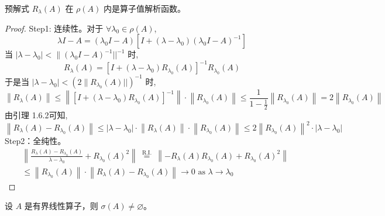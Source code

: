 \documentclass[lang=cn,newtx,10pt,scheme=chinese,thmcnt=chapter]{elegantbook}
\begin{document}
\begin{theorem}预解式 $R_\lambda(A)$ 在 $\rho(A)$ 内是算子值解析函数。
\end{theorem}
\begin{proof}
Step1: 连续性。对于 $\forall \lambda_0 \in \rho(A)$,
\begin{equation*}
\lambda I-A=\left(\lambda_0 I-A\right)\left[I+\left(\lambda-\lambda_0\right)\left(\lambda_0 I-A\right)^{-1}\right]
\end{equation*}
当 $\left|\lambda-\lambda_0\right|<\|\left(\lambda_0 I-A\right)^{-1}| |^{-1}$ 时,
\begin{equation*}
R_\lambda(A)=\left[I+\left(\lambda-\lambda_0\right) R_{\lambda_0}(A)\right]^{-1} R_{\lambda_0}(A)
\end{equation*}
于是当 $\left|\lambda-\lambda_0\right|<\left(2 \| R_{\lambda_0}(A)| |\right)^{-1}$ 时,
\begin{equation*}
\left\|R_\lambda(A)\right\| \leqslant\left\|\left[I+\left(\lambda-\lambda_0\right) R_{\lambda_0}(A)\right]^{-1}\right\| \cdot\left\|R_{\lambda_0}(A)\right\| \leqslant \frac{1}{1-\frac{1}{2}}\left\|R_{\lambda_0}(A)\right\|=2\left\|R_{\lambda_0}(A)\right\|
\end{equation*}
由引理 1.6.2可知,
\begin{equation*}
\left\|R_\lambda(A)-R_{\lambda_0}(A)\right\| \leqslant\left|\lambda-\lambda_0\right| \cdot\left\|R_\lambda(A)\right\| \cdot\left\|R_{\lambda_0}(A)\right\| \leqslant 2\left\|R_{\lambda_0}(A)\right\|^2 \cdot\left|\lambda-\lambda_0\right|
\end{equation*}
Step2：全纯性。
\begin{equation*}
\begin{aligned}
&\left\|\frac{R_\lambda(A)-R_{\lambda_0}(A)}{\lambda-\lambda_0}+R_{\lambda_0}(A)^2\right\| \stackrel{\text { R.I. }}{=}\left\|-R_\lambda(A) R_{\lambda_0}(A)+R_{\lambda_0}(A)^2\right\| \\
& \leqslant\left\|R_{\lambda_0}(A)\right\| \cdot\left\|R_\lambda(A)-R_{\lambda_0}(A)\right\| \rightarrow 0 \text { as } \lambda \rightarrow \lambda_0
\end{aligned}
\end{equation*}

\end{proof}

\begin{theorem}
设 $A$ 是有界线性算子，则 $\sigma(A) \neq \varnothing$。
\end{theorem}
\end{document}
